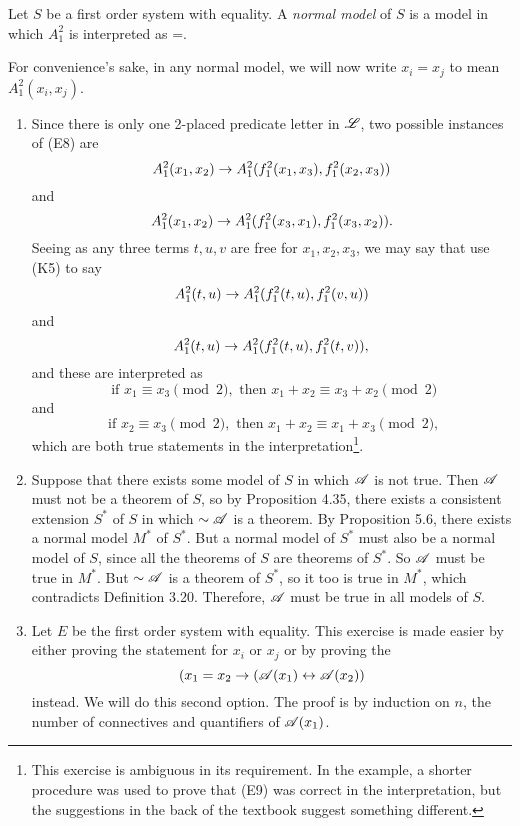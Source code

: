 \begin{definition}
  Let \(S\) be a first order system with equality. A \textit{normal model} of \(S\) is a model in which \(A^2_1\) is interpreted as =.
\end{definition}

For convenience's sake, in any normal model, we will now write \(x_i = x_j\) to mean \(A^2_1(x_i, x_j)\).

\solutions
\begin{enumerate}
  \item %
    Since there is only one 2-placed predicate letter in \(\mathscr{L}\), two possible instances of (E8) are
    \[A^2_1(x_1, x_2) \rightarrow A^2_1(f^2_1(x_1, x_3), f^2_1(x_2, x_3))\]
    and
    \[A^2_1(x_1, x_2) \rightarrow A^2_1(f^2_1(x_3, x_1), f^2_1(x_3, x_2)).\]
    Seeing as any three terms \(t, u, v\) are free for \(x_1, x_2, x_3\), we may say that use (K5) to say
    \[A^2_1(t, u) \rightarrow A^2_1(f^2_1(t, u), f^2_1(v, u))\]
    and
    \[A^2_1(t, u) \rightarrow A^2_1(f^2_1(t, u), f^2_1(t, v)),\]
    and these are interpreted as
    \[\text{ if } x_1 \equiv x_3 \pmod{2}, \text{ then } x_1 + x_2 \equiv x_3 + x_2 \pmod{2}\]
    and
    \[\text{ if } x_2 \equiv x_3 \pmod{2}, \text{ then } x_1 + x_2 \equiv x_1 + x_3 \pmod{2},\]
    which are both true statements in the interpretation\footnote{This exercise is ambiguous in its requirement. In the example, a shorter procedure was used to prove that (E9) was correct in the interpretation, but the suggestions in the back of the textbook suggest something different.}.

  \item %
    Suppose that there exists some model of \(S\) in which \(\mathscr{A}\) is not true. Then \(\mathscr{A}\) must not be a theorem of \(S\), so by Proposition 4.35, there exists a consistent extension \(S^*\) of \(S\) in which \(\sim\mathscr{A}\) is a theorem. By Proposition 5.6, there exists a normal model \(M^*\) of \(S^*\). But a normal model of \(S^*\) must also be a normal model of \(S\), since all the theorems of \(S\) are theorems of \(S^*\). So \(\mathscr{A}\) must be true in \(M^*\). But \(\sim\mathscr{A}\) is a theorem of \(S^*\), so it too is true in \(M^*\), which contradicts Definition 3.20. Therefore, \(\mathscr{A}\) must be true in all models of \(S\).

  \item %
    Let \(E\) be the first order system with equality. This exercise is made easier by either proving the statement for \(x_i\) or \(x_j\) or by proving the \wf{}
    \[(x_1 = x_2 \rightarrow (\mathscr{A}(x_1) \leftrightarrow \mathscr{A}(x_2))\]
    instead. We will do this second option. The proof is by induction on \(n\), the number of connectives and quantifiers of \(\mathscr{A}(x_1)\).


\end{enumerate}
